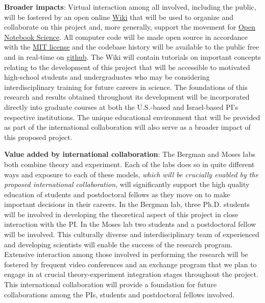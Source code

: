 \textbf{Broader impacts}: \noindent Virtual interaction among all involved, including the public, will be fostered by an open online \href{http://en.wikipedia.org/wiki/Wiki}{Wiki} that will be used to organize and collaborate on this project and, more generally, support the movement for \href{http://en.wikipedia.org/wiki/Open\_notebook\_science}{Open Notebook Science}. All computer code will be made open source in accordance with the \href{http://opensource.org/licenses/MIT}{MIT license} and the codebase history will be available to the public free and in real-time on \href{http://www.github.com}{github}. The Wiki will contain tutorials on important concepts relating to the development of this project that will be accessible to motivated high-school students and undergraduates who may be considering interdisciplinary training for future careers in science. The foundations of this research and results obtained throughout its development will be incorporated directly into graduate courses at both the U.S.-based and Israel-based PI’s respective institutions. The unique educational environment that will be provided as part of the international collaboration will also serve as a broader impact of this proposed project.

\textbf{Value added by international collaboration}: The Bergman and Moses labs both combine theory and experiment. Each of the labs does so in quite different ways and exposure to each of these models, {\it which will be crucially enabled by the proposed international collaboration}, will significantly support the high quality education of students and postdoctoral fellows as they move on to make important decisions in their careers. In the Bergman lab, three Ph.D. students will be involved in developing the theoretical aspect of this project in close interaction with the PI. In the Moses lab two students and a postdoctoral fellow will be involved. This culturally diverse and interdisciplinary team of experienced and developing scientists will enable the success of the research program. Extensive interaction among those involved in performing the research will be fostered by frequent video conferences and an exchange program that we plan to engage in at crucial theory-experiment integration stages throughout the project. This international collaboration will provide a foundation for future collaborations among the PIs, students and postdoctoral fellows involved.
\pagebreak